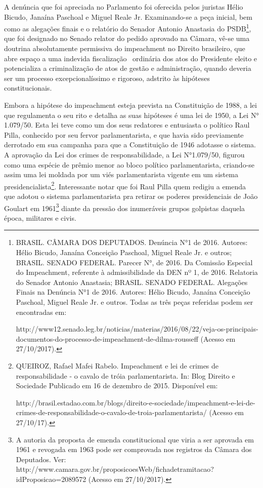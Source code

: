 A denúncia que foi apreciada no Parlamento foi oferecida pelos juristas
Hélio Bicudo, Janaína Paschoal e Miguel Reale Jr. Examinando-se a peça
inicial, bem como as alegações finais e o relatório do Senador Antonio
Anastasia do PSDB\footnote{BRASIL. CÂMARA DOS DEPUTADOS. Denúncia N°1 de
  2016. Autores: Hélio Bicudo, Janaína Conceição Paschoal, Miguel Reale
  Jr. e outros; BRASIL. SENADO FEDERAL. Parecer N°, de 2016. Da Comissão
  Especial do Impeachment, referente à admissibilidade da DEN nº 1, de
  2016. Relatoria do Senador Antonio Anastasia; BRASIL. SENADO FEDERAL.
  Alegações Finais na Denúncia N°1 de 2016. Autores: Hélio Bicudo,
  Janaína Conceição Paschoal, Miguel Reale Jr. e outros. Todas as três
  peças referidas podem ser encontradas em:

  http://www12.senado.leg.br/noticias/materias/2016/08/22/veja-os-principais-documentos-do-processo-de-impeachment-de-dilma-rousseff
  (Acesso em 27/10/2017).}, que foi designado no Senado relator do
pedido aprovado na Câmara, vê-se uma doutrina absolutamente permissiva
do impeachment no Direito brasileiro, que abre espaço a uma indevida
fiscalização~ ordinária dos atos do Presidente eleito e potencializa a
criminalização de atos de gestão e administração, quando deveria ser um
processo excepcionalíssimo e rigoroso, adstrito às hipóteses
constitucionais.

Embora a hipótese do impeachment esteja prevista na Constituição de
1988, a lei que regulamenta o seu rito e detalha as suas hipóteses é uma
lei de 1950, a Lei N° 1.079/50. Esta lei teve como um dos seus redatores
e entusiasta o político Raul Pilla, conhecido por seu fervor
parlamentarista, e que havia sido previamente derrotado em sua campanha
para que a Constituição de 1946 adotasse o sistema. A aprovação da Lei
dos crimes de responsabilidade, a Lei N°1.079/50, figurou como uma
espécie de prêmio menor ao bloco político parlamentarista, criando-se
assim uma lei moldada por um viés parlamentarista vigente em um sistema
presidencialista\footnote{QUEIROZ, Rafael Mafei Rabelo. Impeachment e
  lei de crimes de responsabilidade - o cavalo de tróia parlamentarista.
  In: Blog Direito e Sociedade Publicado em 16 de dezembro de 2015.
  Disponível em:

  http://brasil.estadao.com.br/blogs/direito-e-sociedade/impeachment-e-lei-de-crimes-de-responsabilidade-o-cavalo-de-troia-parlamentarista/
  (Acesso em 27/10/17).}. Interessante notar que foi Raul Pilla quem
redigiu a emenda que adotou o sistema parlamentarista pra retirar os
poderes presidenciais de João Goulart em 1961\footnote{A autoria da
  proposta de emenda constitucional que viria a ser aprovada em 1961 e
  revogada em 1963 pode ser comprovada nos registros da Câmara dos
  Deputados. Ver:
  http://www.camara.gov.br/proposicoesWeb/fichadetramitacao?idProposicao=2089572
  (Acesso em 27/10/2017).} diante da pressão dos inumeráveis grupos
golpistas daquela época, militares e civis.

